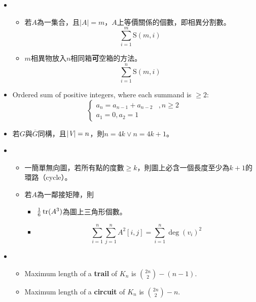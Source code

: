 \begin{itemize}
    \item \quad\quad \begin{itemize}
        \item 若$A$為一集合，且$|A| = m$，$A$上等價關係的個數，即相異分割數。\begin{equation}
            \sum_{i = 1}^{m} \text{S}(m, i)
        \end{equation}
        \item $m$相異物放入$n$相同箱\textbf{可}空箱的方法。\begin{equation}
            \sum_{i = 1}^{n} \text{S}(m, i)
        \end{equation}
    \end{itemize}
    \item Ordered sum of positive integers, where each summand is $\ge 2$: \begin{equation}
        \begin{cases}
            a_n = a_{n - 1} + a_{n - 2} &, n \ge 2 \\
            a_1 = 0, a_2 = 1     
        \end{cases}
    \end{equation}
    \item 若$G$與$\overline{G}$同構，且$|\textit{V}| = n$，則$n = 4k \lor n = 4k + 1$。
    \item \quad\quad
    \begin{itemize}
        \item 一簡單無向圖，若所有點的度數$\ge k$，則圖上必含一個長度至少為$k + 1$的環路（cycle）。
        \item 若$A$為一鄰接矩陣，則\begin{itemize}
            \item $\frac{1}{6}\operatorname{tr}(A^3)$為圖上三角形個數。
            \item \begin{equation}
                \sum_{i = 1}^{n}\sum_{j = 1}^{n} A^2[i, j] = \sum_{i = 1}^{n} \deg(v_i)^2
            \end{equation}
        \end{itemize}
    \end{itemize}
    \item \quad\quad
    \begin{itemize}
        \item Maximum length of a \textbf{trail} of $K_n$ is $\binom{2n}{2} - (n - 1)$.
        \item Maximum length of a \textbf{circuit} of $K_n$ is $\binom{2n}{2} - n$.
    \end{itemize}

\end{itemize}
